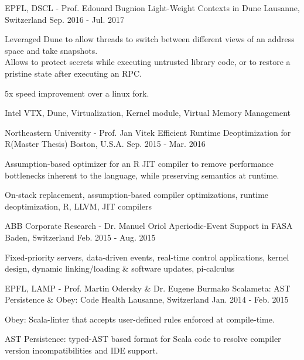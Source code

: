 \begin{cventries}
\cventry
{EPFL, DSCL - Prof. Edouard Bugnion}
{Light-Weight Contexts in Dune}
{Lausanne, Switzerland}
{Sep. 2016 - Jul. 2017}
{
	\begin{cvitems}
  \item{Leveraged Dune to allow threads to switch between different views of
    an address space and take snapshots.\\Allows to protect secrets while executing untrusted library code, or to restore a pristine state after executing an RPC.}
  \item{5x speed improvement over a linux fork.}
	\item{Intel VTX, Dune, Virtualization, Kernel module, Virtual Memory Management}
	\end{cvitems}
}

\cventry
{Northeastern University - Prof. Jan Vitek} %
{Efficient Runtime Deoptimization for R(Master Thesis)} %
{Boston, U.S.A.} %
{Sep. 2015 - Mar. 2016} %
{ %
\begin{cvitems}
\item{Assumption-based optimizer for an R JIT compiler to remove performance bottlenecks inherent to the language, while preserving semantics at runtime.}
\item {On-stack replacement, assumption-based compiler optimizations, runtime deoptimization, R, LLVM, JIT compilers}
\end{cvitems}
}

\cventry
{ABB Corporate Research - Dr. Manuel Oriol}
{Aperiodic-Event Support in FASA}
{Baden, Switzerland}
{Feb. 2015 - Aug. 2015}
{
	\begin{cvitems}
	\item{Fixed-priority servers, data-driven events, real-time control applications, kernel design, dynamic linking/loading \& software updates, pi-calculus}
	\end{cvitems}
}

\cventry
{EPFL, LAMP - Prof. Martin Odersky \& Dr. Eugene Burmako}
{Scalameta: AST Persistence \& Obey: Code Health}
{Lausanne, Switzerland}
{Jan. 2014 - Feb. 2015}
{
	\begin{cvitems}
	\item{Obey: Scala-linter that accepts user-defined rules enforced at compile-time.}
	\item{AST Persistence: typed-AST based format for Scala code to resolve
    compiler version incompatibilities and IDE support.}
	\end{cvitems}
}

\end{cventries}
